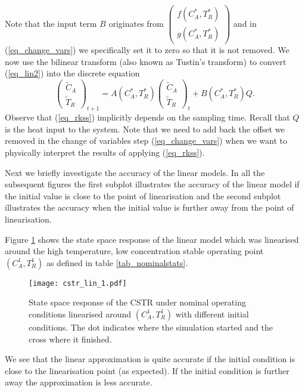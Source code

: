 Note that the input term $B$ originates from $\begin{pmatrix}
f(C_A^*, T_R^*) \\ g(C_A^*, T_R^*)
\end{pmatrix}$ and in (\ref{eq_change_vars}) we specifically set it to zero so that it is not removed. We now use the bilinear transform (also known as Tustin's transform) to convert (\ref{eq_lin2}) into the discrete equation
\begin{equation}
\begin{pmatrix}
\tilde{C}_A \\ \tilde{T}_R
\end{pmatrix}_{t+1} = A(C_A^*, T_R^*) \begin{pmatrix}
\tilde{C}_A \\ \tilde{T}_R
\end{pmatrix}_{t} + B(C_A^*, T_R^*)Q. 
\label{eq_rkss}
\end{equation}
Observe that (\ref{eq_rkss}) implicitly depends on the sampling time. Recall that $Q$ is the heat input to the system. Note that we need to add back the offset we removed in the change of variables step (\ref{eq_change_vars}) when we want to physically interpret the results of applying (\ref{eq_rkss}).

Next we briefly investigate the accuracy of the linear models. In all the subsequent figures the first subplot illustrates the accuracy of the linear model if the initial value is close to the point of linearisation and the second subplot illustrates the accuracy when the initial value is further away from the point of linearisation.

Figure \ref{fig_cstr_lin_1} shows the state space response of the linear model which was linearised around the high temperature, low concentration stable operating point $(C_A^1,T_R^1)$ as defined in table \ref{tab_nominalstats}.
\begin{figure}[H] 
\centering
\texttt{[image: cstr\_lin\_1.pdf]}
\caption{State space response of the CSTR under nominal operating conditions linearised around $(C_A^1,T_R^1)$ with different initial conditions. The dot indicates where the simulation started and the cross where it finished.}
\label{fig_cstr_lin_1}
\end{figure}
We see that the linear approximation is quite accurate if the initial condition is close to the linearisation point (as expected). If the initial condition is further away the approximation is less accurate.

